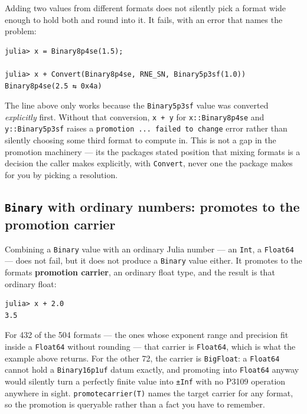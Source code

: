 Adding two values from different formats does not silently pick a format wide enough to hold both and round into it. It fails, with an error that names the problem:




\nopagebreak[4]
\begin{verbatim}
julia> x = Binary8p4se(1.5);

julia> x + Convert(Binary8p4se, RNE_SN, Binary5p3sf(1.0))
Binary8p4se(2.5 ⇆ 0x4a)
\end{verbatim}



The line above only works because the \texttt{Binary5p3sf} value was converted \emph{explicitly} first. Without that conversion, \texttt{x + y} for \texttt{x::Binary8p4se} and \texttt{y::Binary5p3sf} raises a \texttt{promotion ... failed to change} error rather than silently choosing some third format to compute in. This is not a gap in the promotion machinery — it{\textquotesingle}s the package{\textquotesingle}s stated position that mixing formats is a decision the caller makes explicitly, with \texttt{Convert}, never one the package makes for you by picking a resolution.



\subsection{\texttt{Binary} with ordinary numbers: promotes to the promotion carrier}



\label{3293283507695187362}{}


Combining a \texttt{Binary} value with an ordinary Julia number — an \texttt{Int}, a \texttt{Float64} — does not fail, but it does not produce a \texttt{Binary} value either. It promotes to the format{\textquotesingle}s \textbf{promotion carrier}, an ordinary float type, and the result is that ordinary float:




\nopagebreak[4]
\begin{verbatim}
julia> x + 2.0
3.5
\end{verbatim}



For 432 of the 504 formats — the ones whose exponent range and precision fit inside a \texttt{Float64} without rounding — that carrier is \texttt{Float64}, which is what the example above returns. For the other 72, the carrier is \texttt{BigFloat}: a \texttt{Float64} cannot hold a \texttt{Binary16p1uf} datum exactly, and promoting into \texttt{Float64} anyway would silently turn a perfectly finite value into \texttt{±Inf} with no P3109 operation anywhere in sight. \texttt{promotecarrier(T)} names the target carrier for any format, so the promotion is queryable rather than a fact you have to remember.



